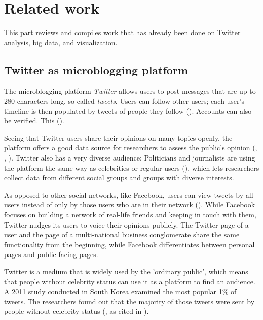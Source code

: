 \section{Related work}
This part reviews and compiles work that has already been done on Twitter analysis, big data, and visualization.

\subsection{Twitter as microblogging platform}
The microblogging platform \emph{Twitter} allows users to post messages that are up to 280 characters long, so-called \emph{tweets}. Users can follow other users; each user's timeline is then populated by tweets of people they follow (\cite{thimmTwitterAlsWahlkampfmedium2012}). Accounts can also be verified. This  (\cite{twitterinc.VerifiedAccounts}).

Seeing that Twitter users share their opinions on many topics openly, the platform offers a good data source for researchers to assess the public's opinion (\cite{pak2010twitter}, \cite{pfaffenberger2016twitter}, \cite{broniatowski2014twitter}). Twitter also has a very diverse audience: Politicians and journalists are using the platform the same way as celebrities or regular users (\cite{pak2010twitter}), which lets researchers collect data from different social groups and groups with diverse interests.

As opposed to other social networks, like Facebook, users can view tweets by all users instead of only by those users who are in their network (\cite{parkDoesTwitterMotivate2013}). While Facebook focuses on building a network of real-life friends and keeping in touch with them, Twitter nudges its users to voice their opinions publicly. The Twitter page of a user and the page of a multi-national business conglomerate share the same functionality from the beginning, while Facebook differentiates between personal pages and public-facing pages.

Twitter is a medium that is widely used by the 'ordinary public', which means that people without celebrity status can use it as a platform to find an audience. A 2011 study conducted in South Korea examined the most popular 1\% of tweets. The researchers found out that the majority of those tweets were sent by people without celebrity status (\cite{chang2011structure}, as cited in \cite{parkDoesTwitterMotivate2013}).

